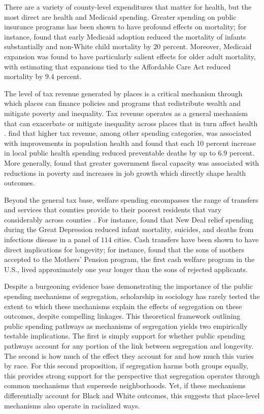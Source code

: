 \documentclass[11pt]{article}
\begin{document}
There are a variety of county-level expenditures that matter for health, but the most direct are health and Medicaid spending. Greater spending on public insurance programs has been shown to have profound effects on mortality; for instance, \citet{goodman-bacon_public_2018} found that early Medicaid adoption reduced the mortality of infants substantially and non-White child mortality by $20$ percent. Moreover, Medicaid expansion was found to have particularly salient effects for older adult mortality, with \citet{miller_medicaid_2021} estimating that expansions tied to the Affordable Care Act reduced mortality by $9.4$ percent.

The level of tax revenue generated by places is a critical mechanism through which places can finance policies and programs that redistribute wealth and mitigate poverty and inequality. Tax revenue operates as a general mechanism that can exacerbate or mitigate inequality across places that in turn affect health \citep{rauscher_variation_2022,obrien_fiscal_2025}. \citet{mccullough_government_2016} find that higher tax revenue, among other spending categories, was associated with improvements in population health and \citet{mays_evidence_2011} found that each 10 percent increase in local public health spending reduced preventable deaths by up to $6.9$ percent. More generally, \citet{lobao_poverty_2012} found that greater government fiscal capacity was associated with reductions in poverty and increases in job growth which directly shape health outcomes.

Beyond the general tax base, welfare spending encompasses the range of transfers and services that counties provide to their poorest residents that vary considerably across counties \citep{bruch_consequences_2018}. For instance, \citet{fishback_births_2007} found that New Deal relief spending during the Great Depression reduced infant mortality, suicides, and deaths from infectious disease in a panel of $114$ cities. Cash transfers have been shown to have direct implications for longevity; for instance, \citet{aizer_long-run_2016} found that the sons of mothers accepted to the Mothers' Pension program, the first cash welfare program in the U.S., lived approximately one year longer than the sons of rejected applicants.

Despite a burgeoning evidence base demonstrating the importance of the public spending mechanisms of segregation, scholarship in sociology has rarely tested the extent to which these mechanisms explain the effects of segregation on these outcomes, despite compelling linkages. This theoretical framework outlining public spending pathways as mechanisms of segregation yields two empirically testable implications. The first is simply support for whether public spending pathways account for any portion of the link between segregation and longevity. The second is how much of the effect they account for and how much this varies by race. For this second proposition, if segregation harms both groups equally, this provides strong support for the perspective that segregation operates through common mechanisms that supersede neighborhoods. Yet, if these mechanisms differentially account for Black and White outcomes, this suggests that place-level mechanisms also operate in racialized ways.
\end{document}
